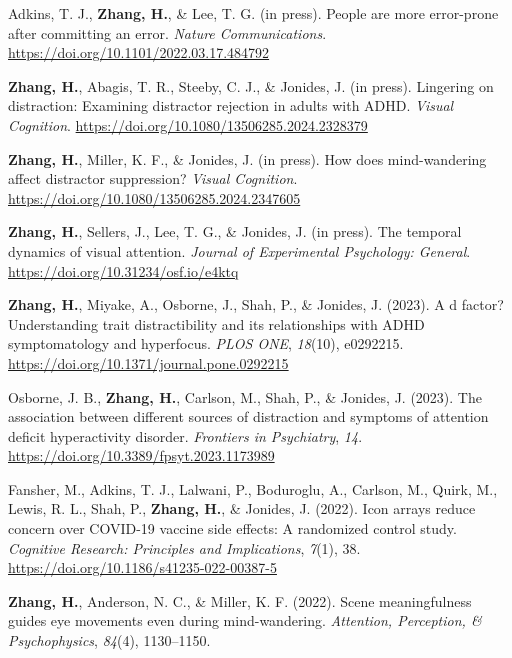 \documentclass[11pt,a4paper,]{awesome-cv}
\begin{document}
\hypertarget{bibliography}{}
\leavevmode{}%
Adkins, T. J., \textbf{Zhang, H.}, \& Lee, T. G. (in press). People are
more error-prone after committing an error. \emph{Nature
Communications}. \url{https://doi.org/10.1101/2022.03.17.484792}

\leavevmode{}%
\textbf{Zhang, H.}, Abagis, T. R., Steeby, C. J., \& Jonides, J. (in
press). Lingering on distraction: Examining distractor rejection in
adults with ADHD. \emph{Visual Cognition}.
\url{https://doi.org/10.1080/13506285.2024.2328379}

\leavevmode{}%
\textbf{Zhang, H.}, Miller, K. F., \& Jonides, J. (in press). How does
mind-wandering affect distractor suppression? \emph{Visual Cognition}.
\url{https://doi.org/10.1080/13506285.2024.2347605}

\leavevmode{}%
\textbf{Zhang, H.}, Sellers, J., Lee, T. G., \& Jonides, J. (in press).
The temporal dynamics of visual attention. \emph{Journal of Experimental
Psychology: General}. \url{https://doi.org/10.31234/osf.io/e4ktq}

\leavevmode{}%
\textbf{Zhang, H.}, Miyake, A., Osborne, J., Shah, P., \& Jonides, J.
(2023). A d factor? Understanding trait distractibility and its
relationships with ADHD symptomatology and hyperfocus. \emph{PLOS ONE},
\emph{18}(10), e0292215.
\url{https://doi.org/10.1371/journal.pone.0292215}

\leavevmode{}%
Osborne, J. B., \textbf{Zhang, H.}, Carlson, M., Shah, P., \& Jonides,
J. (2023). The association between different sources of distraction and
symptoms of attention deficit hyperactivity disorder. \emph{Frontiers in
Psychiatry}, \emph{14}. \url{https://doi.org/10.3389/fpsyt.2023.1173989}

\leavevmode{}%
Fansher, M., Adkins, T. J., Lalwani, P., Boduroglu, A., Carlson, M.,
Quirk, M., Lewis, R. L., Shah, P., \textbf{Zhang, H.}, \& Jonides, J.
(2022). Icon arrays reduce concern over COVID-19 vaccine side effects: A
randomized control study. \emph{Cognitive Research: Principles and
Implications}, \emph{7}(1), 38.
\url{https://doi.org/10.1186/s41235-022-00387-5}

\leavevmode{}%
\textbf{Zhang, H.}, Anderson, N. C., \& Miller, K. F. (2022). Scene
meaningfulness guides eye movements even during mind-wandering.
\emph{Attention, Perception, \& Psychophysics}, \emph{84}(4),
1130--1150.
\end{document}
